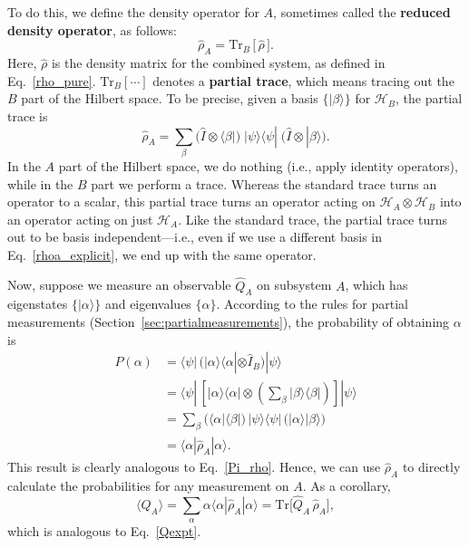 \documentclass[pra,12pt]{revtex4-2}
\begin{document}
To do this, we define the density operator for $A$, sometimes called
the \textbf{reduced density operator}, as follows:
\begin{equation}
  \hat{\rho}_A = \mathrm{Tr}_B \,\big[\,\hat{\rho}\,\big].
  \label{rhoa_def}
\end{equation}
Here, $\hat{\rho}$ is the density matrix for the combined system, as
defined in Eq.~\eqref{rho_pure}.  $\mathrm{Tr}_B[\cdots]$ denotes a
\textbf{partial trace}, which means tracing out the $B$ part of the
Hilbert space.  To be precise, given a basis $\{|\beta\rangle\}$ for
$\mathscr{H}_B$, the partial trace is
\begin{equation}
  \hat{\rho}_A =
    \sum_\beta
    \Big( \hat{I}\otimes \langle \beta| \Big)
    \; |\psi\rangle \langle \psi | \;
    \Big( \hat{I}\otimes | \beta\rangle \Big).
    \label{rhoa_explicit}
\end{equation}
In the $A$ part of the Hilbert space, we do nothing (i.e., apply
identity operators), while in the $B$ part we perform a trace.
Whereas the standard trace turns an operator to a scalar, this partial
trace turns an operator acting on $\mathscr{H}_A \otimes
\mathscr{H}_B$ into an operator acting on just $\mathscr{H}_A$.  Like
the standard trace, the partial trace turns out to be basis
independent---i.e., even if we use a different basis in
Eq.~\eqref{rhoa_explicit}, we end up with the same operator.

Now, suppose we measure an observable $\hat{Q}_A$ on subsystem $A$,
which has eigenstates $\{|\alpha\rangle\}$ and eigenvalues
$\{\alpha\}$.  According to the rules for partial measurements
(Section~\ref{sec:partialmeasurements}), the probability of obtaining
$\alpha$ is
\begin{align}
  P(\alpha)
    &=
    \langle \psi | \,
    \Big( |\alpha\rangle \langle \alpha| \otimes \hat{I}_B\Big) |\psi\rangle \\
    &=
    \langle \psi | \,
    \left[ |\alpha\rangle \langle \alpha| \otimes
      \left(\sum_\beta | \beta\rangle \langle \beta|\right) \right]
    |\psi\rangle \\
    &=
    \sum_\beta
    \Big( \langle \alpha| \langle \beta| \Big)
    \, |\psi\rangle \langle \psi | \,
    \Big( |\alpha\rangle | \beta\rangle \Big) \\
    &= \langle \alpha | \hat{\rho}_A | \alpha \rangle.
    \label{rho_prob}
\end{align}
This result is clearly analogous to Eq.~\eqref{Pi_rho}.  Hence, we can
use $\hat{\rho}_A$ to directly calculate the probabilities for any
measurement on $A$.  As a corollary,
\begin{equation}
  \langle Q_A \rangle = \sum_\alpha \alpha
  \langle \alpha | \hat{\rho}_A | \alpha \rangle
  = \mathrm{Tr}\Big[\hat{Q}_A \, \hat{\rho}_A \Big],
  \label{rho_expect}
\end{equation}
which is analogous to Eq.~\eqref{Qexpt}.
    
\end{document}

